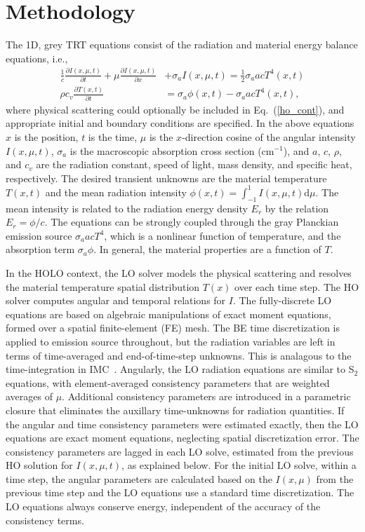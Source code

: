\documentclass{anstrans}
\renewcommand{\eqref}[1]{(\ref{#1})}
\newcommand{\pderiv}[2]{\frac{\partial #1}{\partial #2}}
\renewcommand{\d}{\mathrm{d}}
\begin{document}
\section{Methodology}
The 1D, grey TRT equations consist of the radiation and
material energy balance equations, i.e.,\vspace{-0.05in}
\begin{align}\label{ho_cont}
    \frac{1}{c}\pderiv{I(x,\mu,t)}{t} + \mu \pderiv{I(x,\mu,t)}{x} &+ \sigma_a
    I(x,\mu,t)
= \frac{1}{2} \sigma_a a c T^4(x,t)
    \\ \label{t_cont}
  \rho c_v \pderiv{T(x,t)}{t} &=  \sigma_a \phi(x,t) - \sigma_a a c T^4(x,t),
\end{align}
where physical scattering could optionally be included in Eq.~\eqref{ho_cont}, and
appropriate initial and boundary conditions are specified.
In the above equations $x$ is the position, $t$ is the time, $\mu$ is
the $x$-direction cosine of the angular intensity $I(x,\mu,t)$, $\sigma_a$ is the
macroscopic absorption cross section (cm$^{-1}$), and $a$, $c$, $\rho$,
and
$c_v$ are the radiation constant, speed of light, mass density, and specific heat,
respectively.  The desired transient unknowns are the material
temperature $T(x,t)$ and the mean radiation intensity $\phi(x,t)=\int_{-1}^1
I(x,\mu,t) \d \mu$.  The mean intensity is related to the radiation energy density
$E_r$ by the relation $E_r = \phi/c$.  The equations can be 
strongly coupled through the gray Planckian emission source $\sigma_a a c T^4$, which
is a nonlinear function of temperature, and the absorption
term $\sigma_a \phi$.   In general, the material properties are a function of $T$.  

In the HOLO context, the LO solver models the physical scattering and
resolves the material temperature spatial distribution $T(x)$ over each time step.  The HO solver
computes angular and temporal relations for $I$.  The
fully-discrete LO equations are based on algebraic manipulations of exact moment equations,
formed over a spatial finite-element (FE)
mesh.  The BE time discretization is applied to emission source throughout, but the radiation
variables are left in terms of time-averaged and end-of-time-step unknowns.  This is analagous to
the time-integration in IMC~\cite{wollaber_review}.   Angularly, the LO
radiation equations are similar to S$_2$ equations,  with element-averaged
consistency parameters that are weighted averages of $\mu$.  Additional
consistency parameters are introduced in a parametric closure that eliminates the auxillary
time-unknowns for radiation quantities.
If the angular and time
consistency parameters were estimated exactly, then the LO equations are exact moment equations,
neglecting spatial discretization error.  The consistency parameters are lagged
in each LO solve, estimated from the previous HO solution for $I(x,\mu,t)$,
as explained below. For the initial LO solve, within a time step, the angular parameters
are calculated based on the $I(x,\mu)$ from the previous time step and the LO equations use a standard time discretization.  The LO equations always conserve energy,
independent of the accuracy of the consistency terms.
\end{document}

